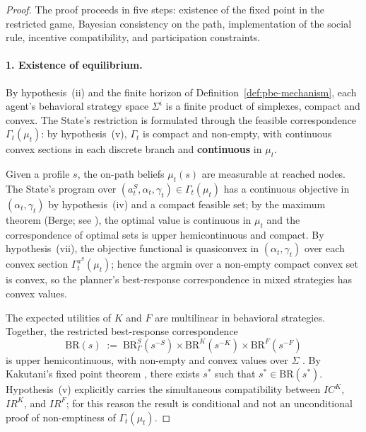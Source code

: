 \documentclass[12pt,a4paper]{article}
\providecommand{\textcite}{\citet}
\theoremstyle{plain}
\theoremstyle{definition}
\theoremstyle{remark}
\newcommand{\1}{\mathbf{1}}
\begin{document}
\begin{proof}
The proof proceeds in five steps: existence of the fixed point in the restricted game,
Bayesian consistency on the path, implementation of the social rule, incentive
compatibility, and participation constraints.

\paragraph{1. Existence of equilibrium.}
By hypothesis~(ii) and the finite horizon of Definition~\ref{def:pbe-mechanism}, each
agent's behavioral strategy space $\Sigma^i$ is a finite product of simplexes, compact
and convex. The State's restriction is formulated through the feasible correspondence
$\Gamma_t(\mu_t)$: by hypothesis~(v), $\Gamma_t$ is compact and non-empty, with
continuous convex sections in each discrete branch and \textbf{continuous} in $\mu_t$.

Given a profile $s$, the on-path beliefs $\mu_t(s)$ are measurable at reached nodes. The
State's program over $(a_t^S,\alpha_t,\gamma_t)\in\Gamma_t(\mu_t)$ has a continuous
objective in $(\alpha_t,\gamma_t)$ by hypothesis~(iv) and a compact feasible set; by the
maximum theorem \textup{(Berge; see \textcite{AliprantisBorder2006})}, the optimal value
is continuous in $\mu_t$ and the correspondence of optimal sets is upper
hemicontinuous and compact. By hypothesis~(vii), the objective functional is
quasiconvex in $(\alpha_t,\gamma_t)$ over each convex section
$\Gamma_t^{a^S}(\mu_t)$; hence the argmin over a non-empty compact convex set is convex,
so the planner's best-response correspondence in mixed strategies has convex values.

The expected utilities of $K$ and $F$ are multilinear in behavioral strategies.
Together, the restricted best-response correspondence
\[
\mathrm{BR}(s)\;:=\;\mathrm{BR}^S_\Gamma(s^{-S})\times\mathrm{BR}^K(s^{-K})\times\mathrm{BR}^F(s^{-F})
\]
is upper hemicontinuous, with non-empty and convex values over $\Sigma$
\textcite{FudenbergTirole1991}. By Kakutani's fixed point theorem
\textcite{Kakutani1941}, there exists $s^\ast$ such that $s^\ast\in\mathrm{BR}(s^\ast)$.
Hypothesis~(v) explicitly carries the simultaneous compatibility between $IC^K$,
$IR^K$, and $IR^F$; for this reason the result is conditional and not an unconditional
proof of non-emptiness of $\Gamma_t(\mu_t)$.


\end{proof}
\end{document}
